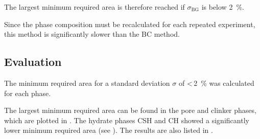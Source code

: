The largest minimum required area is therefore reached if $\sigma_{\text{BG}}$ is below \qty{2}{\percent}.

Since the phase composition must be recalculated for each repeated experiment, this method is significantly slower than the \ac{BC} method.


\subsection{Evaluation}

The minimum required area for a standard deviation $\sigma$ of <\,\qty{2}{\percent} was calculated for each phase.

The largest minimum required area can be found in the pore and clinker phases, which are plotted in .
The hydrate phases \ac{CSH} and \ac{CH} showed a significantly lower minimum required area (see ).
The results are also listed in .

